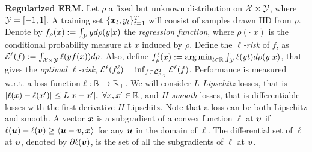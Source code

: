 \textbf{Regularized ERM.}
Let $\rho$ a fixed but unknown distribution on $\mathcal{X} \times \mathcal{Y}$, where $\mathcal{Y}=[-1,1]$.
A training set $\{\boldsymbol{x}_t,y_t\}_{t=1}^T$ will consist of samples drawn \ac{IID} from $\rho$.
Denote by $f_\rho(x):= \int_{\mathcal{Y}} y d\rho(y|x)$ the \emph{regression function}, where $\rho(\cdot|x)$ is the conditional probability measure at $x$ induced by $\rho$. 
Define the \emph{$\ell$-risk} of $f$, as $\mathcal{E}^{\ell}(f):=\int_{\mathcal{X} \times \mathcal{Y}} \ell(y f(x)) d \rho$. Also, define $f^{\ell}_\rho(x):=\operatorname*{arg\,min}_{t \in \mathbb{R}} \int_{\mathcal{Y}} \ell(y t) d \rho(y|x)$, that gives the \emph{optimal $\ell$-risk}, $\mathcal{E}^{\ell}(f^{\ell}_\rho)=\inf_{f \in \mathcal{L}^2_{\rho_{\mathcal{X}}}} \mathcal{E}^{\ell}(f)$.
Performance is measured w.r.t. a loss function $\ell: \mathbb{R} \rightarrow \mathbb{R}_+$. We will consider \emph{$L$-Lipschitz} losses, that is $|\ell(x)-\ell(x')| \leq L |x-x'|, \ \forall x,x' \in \mathbb{R}$, and \emph{$H$-smooth} losses, that is differentiable losses with the first derivative $H$-Lipschitz. Note that a loss can be both Lipschitz and smooth.
A vector $\boldsymbol{x}$ is a subgradient of a convex function $\ell$ at $\boldsymbol{v}$ if $\ell(\boldsymbol{u}) - \ell(\boldsymbol{v}) \ge \langle \boldsymbol{u} - \boldsymbol{v}, \boldsymbol{x} \rangle$ for any $\boldsymbol{u}$ in the domain of $\ell$. The differential set of $\ell$ at $\boldsymbol{v}$, denoted by $\partial \ell(\boldsymbol{v})$, is the set of all the subgradients of $\ell$ at $\boldsymbol{v}$.